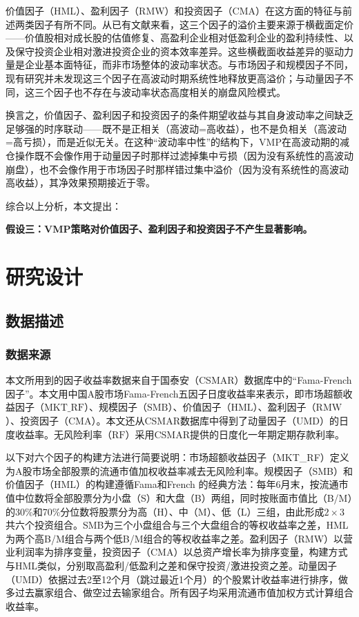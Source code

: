\documentclass[
    decl-page,
    oneside,
  ]{njuthesis}
\begin{document}
价值因子（HML）、盈利因子（RMW）和投资因子（CMA）在这方面的特征与前述两类因子有所不同。从已有文献来看，这三个因子的溢价主要来源于横截面定价——价值股相对成长股的估值修复、高盈利企业相对低盈利企业的盈利持续性、以及保守投资企业相对激进投资企业的资本效率差异。这些横截面收益差异的驱动力量是企业基本面特征，而非市场整体的波动率状态。与市场因子和规模因子不同，现有研究并未发现这三个因子在高波动时期系统性地释放更高溢价；与动量因子不同，这三个因子也不存在与波动率状态高度相关的崩盘风险模式。

换言之，价值因子、盈利因子和投资因子的条件期望收益与其自身波动率之间缺乏足够强的时序联动——既不是正相关（高波动=高收益），也不是负相关（高波动=高亏损），而是近似无关。在这种“波动率中性”的结构下，VMP在高波动期的减仓操作既不会像作用于动量因子时那样过滤掉集中亏损（因为没有系统性的高波动崩盘），也不会像作用于市场因子时那样错过集中溢价（因为没有系统性的高波动高收益），其净效果预期接近于零。

综合以上分析，本文提出：

\textbf{假设三：VMP策略对价值因子、盈利因子和投资因子不产生显著影响。}

\chapter{研究设计}

\section{数据描述}

\subsection{数据来源}

本文所用到的因子收益率数据来自于国泰安（CSMAR）数据库中的“Fama-French因子”。本文用中国A股市场Fama-French五因子日度收益率来表示，即市场超额收益因子（$\text{MKT\_RF}$）、规模因子（$\text{SMB}$）、价值因子（$\text{HML}$）、盈利因子（$\text{RMW}$）、投资因子（$\text{CMA}$）。本文还从CSMAR数据库中得到了动量因子（$\text{UMD}$）的日度收益率。无风险利率（$\text{RF}$）采用CSMAR提供的日度化一年期定期存款利率。

以下对六个因子的构建方法进行简要说明：市场超额收益因子（MKT\_RF）定义为A股市场全部股票的流通市值加权收益率减去无风险利率。规模因子（SMB）和价值因子（HML）的构建遵循Fama和French \cite{fama1993common} 的经典方法：每年6月末，按流通市值中位数将全部股票分为小盘（S）和大盘（B）两组，同时按账面市值比（B/M）的30\%和70\%分位数将股票分为高（H）、中（M）、低（L）三组，由此形成$2 \times 3$共六个投资组合。SMB为三个小盘组合与三个大盘组合的等权收益率之差，HML为两个高B/M组合与两个低B/M组合的等权收益率之差。盈利因子（RMW）以营业利润率为排序变量，投资因子（CMA）以总资产增长率为排序变量，构建方式与HML类似，分别取高盈利/低盈利之差和保守投资/激进投资之差。动量因子（UMD）依据过去2至12个月（跳过最近1个月）的个股累计收益率进行排序，做多过去赢家组合、做空过去输家组合。所有因子均采用流通市值加权方式计算组合收益率。
\end{document}
